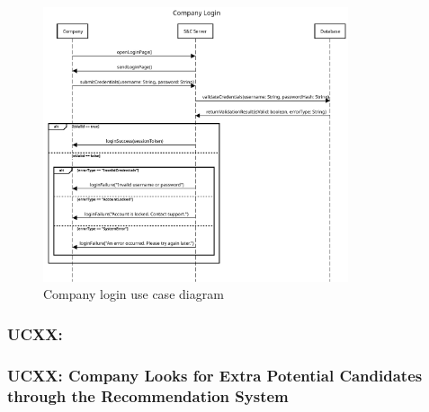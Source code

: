 \begin{figure}[H]
    \centering
    \includegraphics[width=0.8\textwidth]{Images/UC_8.pdf}
    \caption{Company login use case diagram}
    \label{fig:use-case-diagram-8}
\end{figure}

\subsubsection{UCXX: }
\label{subsubsec:UC_09_TO_MODIFY}


\subsubsection{UCXX: Company Looks for Extra Potential Candidates through the Recommendation System}
\label{subsubsec:company-looks-for-extra-potential-candidates-through-the-recommendation-system}

